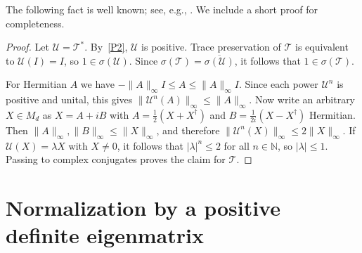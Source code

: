 \documentclass[11pt,a4paper]{article}
\theoremstyle{plain}
\newtheorem{lemma}[theorem]{Lemma}
\theoremstyle{definition}
\theoremstyle{remark}
\numberwithin{equation}{section}
\newcommand{\M}{M_d}
\newcommand{\spec}{\sigma}
\newcommand{\smax}{s}
\newcommand{\cT}{\mathcal{T}}
\newcommand{\cU}{\mathcal{U}}
\newcommand{\norm}[1]{\lVert #1\rVert}
\begin{document}
The following fact is well known; see, e.g., \cite[Prop.~4.26]{Wat18}. We include a
short proof for completeness.


\begin{proof}
Let $\cU=\cT^*$. By~\ref{P2}, $\cU$ is positive. Trace preservation of $\cT$ is
equivalent to $\cU(I)=I$, so $1\in\spec(\cU)$. Since $\spec(\cT)=\overline{\spec(\cU)}$,
it follows that $1\in\spec(\cT)$.

For Hermitian $A$ we have $-\norm{A}_\infty I\le A\le\norm{A}_\infty I$. Since each
power $\cU^n$ is positive and unital, this gives
$\norm{\cU^n(A)}_\infty\le\norm{A}_\infty$. Now write an arbitrary $X\in\M$ as $X=A+iB$ with
$A=\tfrac12(X+X^\dagger)$ and $B=\tfrac1{2i}(X-X^\dagger)$ Hermitian. Then
$\norm{A}_\infty,\norm{B}_\infty\le\norm{X}_\infty$, and therefore
$\norm{\cU^n(X)}_\infty\le2\norm{X}_\infty$. If $\cU(X)=\lambda X$ with $X\ne0$, it
follows that $\lvert\lambda\rvert^n\le2$ for all $n\in\mathbb{N}$, so
$\lvert\lambda\rvert\le1$. Passing to complex conjugates proves the claim for $\cT$.
\end{proof}

\section{Normalization by a positive definite eigenmatrix}\label{sec:normalization}

\end{document}
